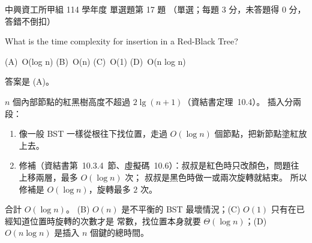 \begin{pastexam}[label={px:nchu-114-dsa-17}]{中興資工所甲組 114 學年度 單選題第 17 題}
（單選；每題 3 分，未答題得 0 分，答錯不倒扣）

What is the time complexity for insertion in a Red-Black Tree?

(A)~O(log n) \qquad (B)~O(n) \qquad (C)~O(1) \qquad (D)~O(n log n)
\end{pastexam}

\begin{pastsoln}
答案是 (A)。

$n$ 個內部節點的紅黑樹高度不超過 $2\lg(n + 1)$（資結書定理~10.4）。 插入分兩段：
\begin{enumerate}
\item 像一般 BST 一樣從根往下找位置，走過 $O(\log n)$ 個節點，把新節點塗紅放上去。
\item 修補（資結書第~10.3.4~節、虛擬碼~10.6）：叔叔是紅色時只改顏色，問題往上移兩層，最多 $O(\log n)$ 次；
叔叔是黑色時做一或兩次旋轉就結束。 所以修補是 $O(\log n)$，旋轉最多 $2$ 次。
\end{enumerate}
合計 $O(\log n)$。 (B) $O(n)$ 是不平衡的 BST 最壞情況；(C) $O(1)$ 只有在已經知道位置時旋轉的次數才是
常數，找位置本身就要 $\Theta(\log n)$；(D) $O(n \log n)$ 是插入 $n$ 個鍵的總時間。
\end{pastsoln}
